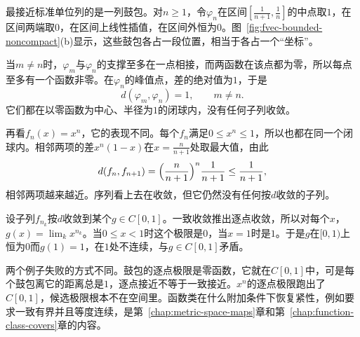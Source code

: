 最接近标准单位列的是一列鼓包。对$n\geq1$，令$\varphi_n$在区间$[\tfrac1{n+1},\tfrac1n]$的中点取$1$，在区间两端取$0$，在区间上线性插值，在区间外恒为$0$。图~\ref{fig:fvec-bounded-noncompact}(b)显示，这些鼓包各占一段位置，相当于各占一个“坐标”。

当$m\neq n$时，$\varphi_m$与$\varphi_n$的支撑至多在一点相接，而两函数在该点都为零，所以每点至多有一个函数非零。在$\varphi_n$的峰值点，差的绝对值为$1$，于是
\[
 d(\varphi_m,\varphi_n)=1,\qquad m\neq n.
\]
它们都在以零函数为中心、半径为$1$的闭球内，没有任何子列收敛。

再看$f_n(x)=x^n$，它的表现不同。每个$f_n$满足$0\leq x^n\leq1$，所以也都在同一个闭球内。相邻两项的差$x^n(1-x)$在$x=\tfrac n{n+1}$处取最大值，由此
\[
 d(f_n,f_{n+1})=\Bigl(\frac n{n+1}\Bigr)^n\frac1{n+1}\leq\frac1{n+1},
\]
相邻两项越来越近。序列看上去在收敛，但它仍然没有任何按$d$收敛的子列。

设子列$f_{n_k}$按$d$收敛到某个$g\in C[0,1]$。一致收敛推出逐点收敛，所以对每个$x$，$g(x)=\lim_kx^{n_k}$。当$0\leq x<1$时这个极限是$0$，当$x=1$时是$1$。于是$g$在$[0,1)$上恒为$0$而$g(1)=1$，在$1$处不连续，与$g\in C[0,1]$矛盾。

两个例子失败的方式不同。鼓包的逐点极限是零函数，它就在$C[0,1]$中，可是每个鼓包离它的距离总是$1$，逐点接近不等于一致接近。$x^n$的逐点极限跑出了$C[0,1]$，候选极限根本不在空间里。函数类在什么附加条件下恢复紧性，例如要求一致有界并且等度连续，是第~\ref{chap:metric-space-maps}章和第~\ref{chap:function-class-covers}章的内容。
